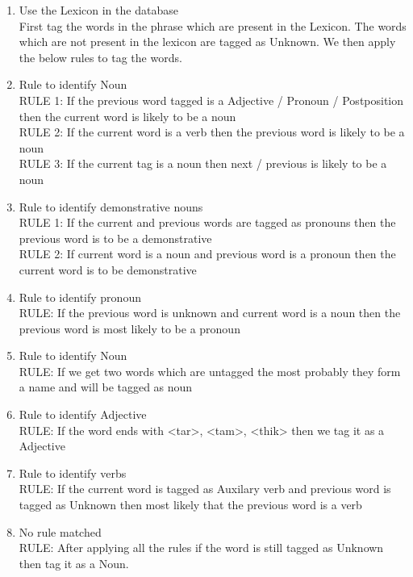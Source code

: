 \break
\begin{enumerate}
\item Use the Lexicon in the database \\
First tag the words in the phrase which are present in the Lexicon. The words which are not present in the lexicon are tagged as Unknown. We then apply the below rules to tag the words.

\item{Rule to identify Noun} \\
RULE 1: If the previous word tagged is a Adjective / Pronoun / Postposition then the current word is likely to be a noun \\	
RULE 2: If the current word is a verb then the previous word is likely to be a noun \\
RULE 3: If the current tag is a noun then next / previous is likely to be a noun
		
\item{Rule to identify demonstrative nouns} \\
RULE 1: If the current and previous words are tagged as pronouns then the previous word is to be a demonstrative \\
RULE 2: If current word is a noun and previous word is a pronoun then the current word is to be demonstrative
		
\item{Rule to identify pronoun} \\
RULE: If the previous word is unknown and current word is a noun then the previous word is most likely to be a pronoun
		
\item{Rule to identify Noun} \\		
RULE: If we get two words which are untagged the most probably they form a name and will be tagged as noun
		
\item{Rule to identify Adjective} \\
RULE: If the word ends with <tar>, <tam>, <thik> then we tag it as a Adjective
		
\item{Rule to identify verbs} \\
RULE: If the current word is tagged as Auxilary verb  and previous word is tagged as Unknown then most likely that the previous word is a verb

\item{No rule matched} \\
RULE: After applying all the rules if the word is still tagged as Unknown then tag it as a Noun.
		
\end{enumerate}
	
